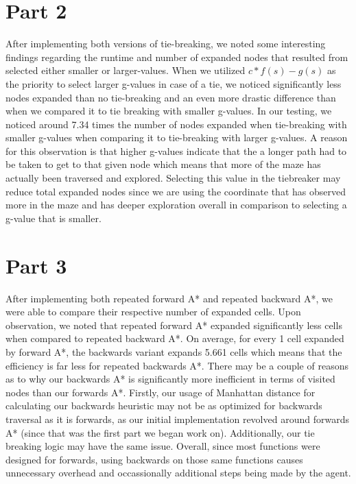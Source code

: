 \documentclass{article}
\begin{document}
\section*{Part 2}
After implementing both versions of tie-breaking, we noted some interesting findings regarding the runtime and number of expanded nodes that resulted from selected either smaller or larger-values. When we utilized $ c * f (s) - g(s) $ as the priority to select larger g-values in case of a tie, we noticed significantly less nodes expanded than no tie-breaking and an even more drastic difference than when we compared it to tie breaking with smaller g-values. In our testing, we noticed around 7.34 times the number of nodes expanded when tie-breaking with smaller g-values when comparing it to tie-breaking with larger g-values. A reason for this observation is that higher g-values indicate that the a longer path had to be taken to get to that given node which means that more of the maze has actually been traversed and explored. Selecting this value in the tiebreaker may reduce total expanded nodes since we are using the coordinate that has observed more in the maze and has deeper exploration overall in comparison to selecting a g-value that is smaller.

\section*{Part 3}
After implementing both repeated forward A* and repeated backward A*, we were able to compare their respective number of expanded cells. Upon observation, we noted that repeated forward A* expanded significantly less cells when compared to repeated backward A*. On average, for every 1 cell expanded by forward A*, the backwards variant expands 5.661 cells which means that the efficiency is far less for repeated backwards A*. There may be a couple of reasons as to why our backwards A* is significantly more inefficient in terms of visited nodes than our forwards A*. Firstly, our usage of Manhattan distance for calculating our backwards heuristic may not be as optimized for backwards traversal as it is forwards, as our initial implementation revolved around forwards A* (since that was the first part we began work on). Additionally, our tie breaking logic may have the same issue. Overall, since most functions were designed for forwards, using backwards on those same functions causes unnecessary overhead and occassionally additional steps being made by the agent.
\end{document}
